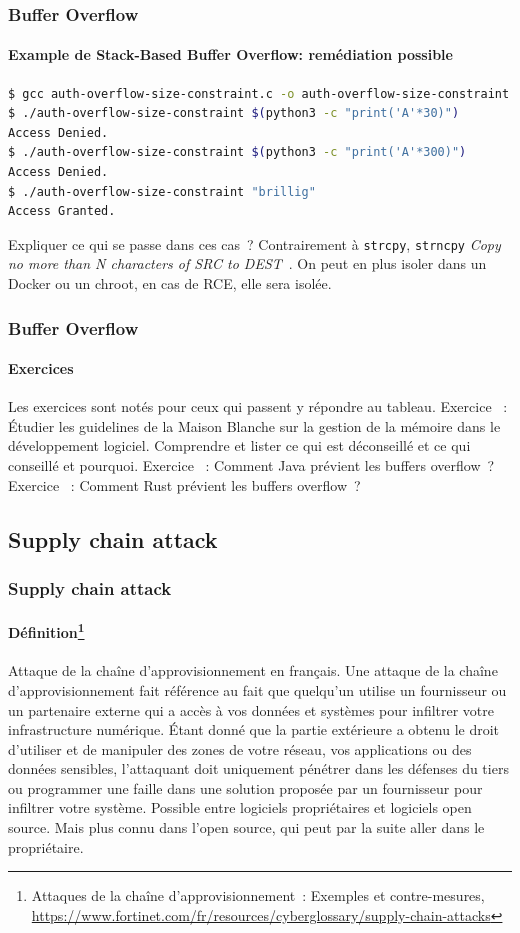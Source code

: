 \documentclass{beamer}
\begin{document}
    \begin{frame}[fragile]
        \frametitle{Buffer Overflow}
        \framesubtitle{Example de Stack-Based Buffer Overflow: remédiation possible}
        \transdissolve
        \begin{lstlisting}[language=bash]
$ gcc auth-overflow-size-constraint.c -o auth-overflow-size-constraint
$ ./auth-overflow-size-constraint $(python3 -c "print('A'*30)")
Access Denied.
$ ./auth-overflow-size-constraint $(python3 -c "print('A'*300)")
Access Denied.
$ ./auth-overflow-size-constraint "brillig"
Access Granted.
        \end{lstlisting}
        Expliquer ce qui se passe dans ces cas~?
        \pause
        \bigbreak
        Contrairement à \lstinline{strcpy}, \lstinline{strncpy} \textit{Copy no more than N characters of SRC to DEST}~.
        \bigbreak
        On peut en plus isoler dans un Docker ou un chroot, en cas de RCE, elle sera isolée.
    \end{frame}

    \begin{frame}
        \frametitle{Buffer Overflow}
        \framesubtitle{Exercices}
        \transdissolve
        Les exercices sont notés pour ceux qui passent y répondre au tableau.
        \bigbreak
        Exercice \execcounterdispinc{}~:
        Étudier les guidelines de la Maison Blanche sur la gestion de la mémoire dans le développement logiciel.
        \bigbreak
        Comprendre et lister ce qui est déconseillé et ce qui conseillé et pourquoi.
        \transdissolve
        Exercice \execcounterdispinc{}~:
        Comment Java prévient les buffers overflow~?
        \bigbreak
        Exercice \execcounterdispinc{}~:
        Comment Rust prévient les buffers overflow~?
    \end{frame}

    \subsection{Supply chain attack}\label{subsec:supply-chain-attack}
    \begin{frame}
        \frametitle{Supply chain attack}
        \framesubtitle{Définition\footnote{Attaques de la chaîne d’approvisionnement~: Exemples et contre-mesures, \url{https://www.fortinet.com/fr/resources/cyberglossary/supply-chain-attacks}}}
        \transdissolve
        Attaque de la chaîne d'approvisionnement en français.
        \bigbreak
        Une attaque de la chaîne d’approvisionnement fait référence au fait que quelqu’un utilise un fournisseur ou un partenaire externe qui a accès à vos données et systèmes pour infiltrer votre infrastructure numérique.
        Étant donné que la partie extérieure a obtenu le droit d’utiliser et de manipuler des zones de votre réseau, vos applications ou des données sensibles, l’attaquant doit uniquement pénétrer dans les défenses du tiers ou programmer une faille dans une solution proposée par un fournisseur pour infiltrer votre système.
        \bigbreak
        Possible entre logiciels propriétaires et logiciels open source.
        Mais plus connu dans l'open source, qui peut par la suite aller dans le propriétaire.
    \end{frame}
\end{document}
